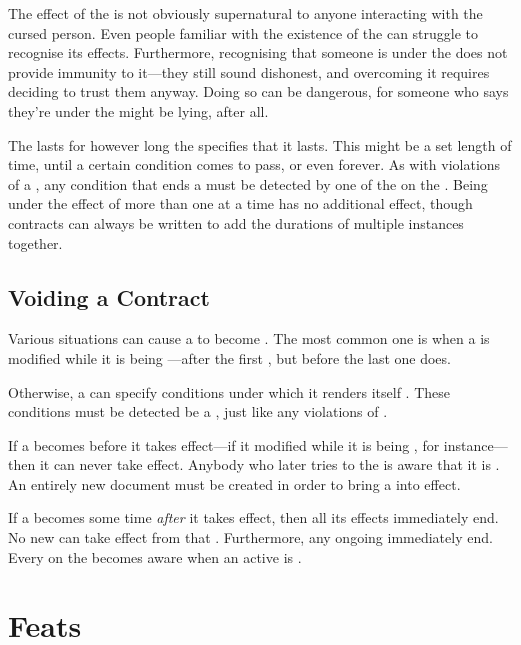 The effect of the {\liarscurse} is not obviously supernatural to anyone interacting with the cursed person.
Even people familiar with the existence of the {\liarscurse} can struggle to recognise its effects.
Furthermore, recognising that someone is under the {\liarscurse} does not provide immunity to it---they still sound dishonest, and overcoming it requires deciding to trust them anyway.
Doing so can be dangerous, for someone who says they're under the {\liarscurse} might be lying, after all.

The {\liarscurse} lasts for however long the {\contract} specifies that it lasts.
This might be a set length of time, until a certain condition comes to pass, or even forever.
As with violations of a {\stipulation}, any condition that ends a {\liarscurse} must be detected by one of the {\signatories} on the {\contract}.
Being under the effect of more than one {\liarscurse} at a time has no additional effect, though contracts can always be written to add the durations of multiple instances together.

\subsection{Voiding a Contract}

Various situations can cause a {\contract} to become {\void}.
The most common one is when a {\contract} is modified while it is being {\signed}---after the first {\signatory} {\signs}, but before the last one does.

Otherwise, a {\contract} can specify conditions under which it renders itself {\void}.
These conditions must be detected be a {\signatory}, just like any violations of {\stipulations}.

If a {\contract} becomes {\void} before it takes effect---if it modified while it is being {\signed}, for instance---then it can never take effect.
Anybody who later tries to {\sign} the {\contract} is aware that it is {\void}.
An entirely new document must be created in order to bring a {\contract} into effect.

If a {\contract} becomes {\void} some time \emph{after} it takes effect, then all its effects immediately end.
No new {\penalties} can take effect from that {\contract}.
Furthermore, any ongoing {\penalties} immediately end.
Every {\signatory} on the {\contract} becomes aware when an active {\contract} is {\voided}.

\section{Feats}

